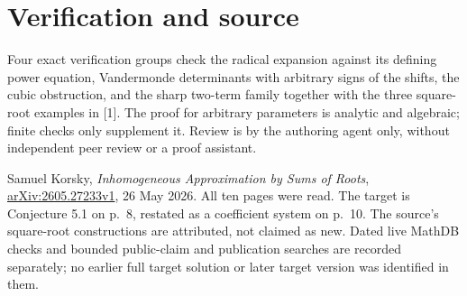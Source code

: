 \documentclass[11pt]{article}
\begin{document}
\section*{Verification and source}
Four exact verification groups check the radical expansion against
its defining power equation, Vandermonde determinants with arbitrary
signs of the shifts, the cubic obstruction, and the sharp two-term
family together with the three square-root examples in [1].
The proof for arbitrary parameters is analytic and algebraic;
finite checks only supplement it. Review is by the authoring agent
only, without independent peer review or a proof assistant.

\medskip\noindent
[1] Samuel Korsky, \emph{Inhomogeneous Approximation by Sums of Roots},
\href{https://arxiv.org/abs/2605.27233}{arXiv:2605.27233v1},
26 May 2026. All ten pages were read. The target is Conjecture 5.1
on p.~8, restated as a coefficient system on p.~10.
The source's square-root constructions are attributed, not claimed
as new. Dated live MathDB checks and bounded public-claim and
publication searches are recorded separately; no earlier full
target solution or later target version was identified in them.
\end{document}
